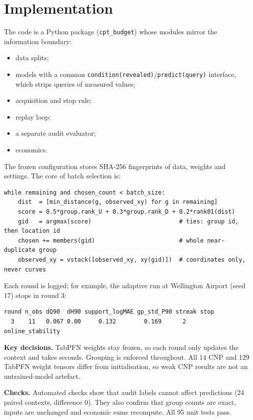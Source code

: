 \section{Implementation}

The code is a Python package (\texttt{cpt\_budget}) whose modules mirror the information boundary:
\begin{itemize}
\item data splits;
\item models with a common \texttt{condition(revealed)}/\texttt{predict(query)} interface, which strips
  queries of measured values;
\item acquisition and stop rule;
\item replay loop;
\item a separate audit evaluator;
\item economics.
\end{itemize}
The frozen configuration stores SHA-256 fingerprints of data, weights and settings. The core of batch
selection is:
\begin{lstlisting}
while remaining and chosen_count < batch_size:
    dist  = [min_distance(g, observed_xy) for g in remaining]
    score = 0.5*group.rank_U + 0.3*group.rank_D + 0.2*rank01(dist)
    gid   = argmax(score)                         # ties: group id, then location id
    chosen += members(gid)                        # whole near-duplicate group
    observed_xy = vstack([observed_xy, xy(gid)])  # coordinates only, never curves
\end{lstlisting}
Each round is logged; for example, the adaptive run at Wellington Airport (seed 17) stops in round 3:
\begin{lstlisting}[style=output]
round n_obs dQ90  dH90 support_logMAE gp_std_P90 streak stop
  3    11   0.067 0.00     0.132        0.169      2    online_stability
\end{lstlisting}
\textbf{Key decisions.} TabPFN weights stay frozen, so each round only updates the context and takes
seconds. Grouping is enforced throughout. All 14 CNP and 129 TabPFN weight tensors differ from
initialisation, so weak CNP results are not an untrained-model artefact.

\textbf{Checks.} Automated checks show that audit labels cannot affect predictions (24 paired contexts,
difference 0). They also confirm that group counts are exact, inputs are unchanged and economic sums
recompute. All 95 unit tests pass.
